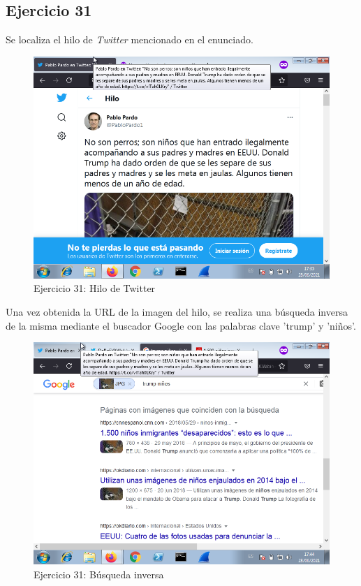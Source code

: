 \documentclass[11pt]{article}
\begin{document}
\subsection{Ejercicio 31}
Se localiza el hilo de \textit{Twitter} mencionado en el enunciado.

\begin{figure}[H]
    \caption{Ejercicio 31: Hilo de Twitter}
  \centering
    \includegraphics[scale=0.8]{p05/e31-1.png}
\end{figure}

Una vez obtenida la URL de la imagen del hilo, se realiza una búsqueda inversa de la misma mediante el buscador Google con las palabras clave 'trump' y 'niños'.

\begin{figure}[H]
    \caption{Ejercicio 31: Búsqueda inversa}
  \centering
    \includegraphics[scale=0.8]{p05/e31-2.png}
\end{figure}
\end{document}
